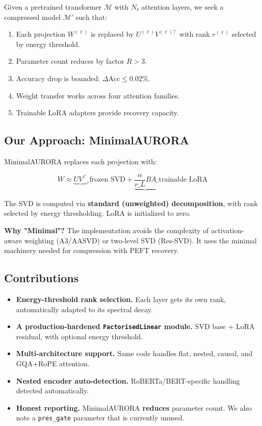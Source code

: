 Given a pretrained transformer $\mathcal{M}$ with $N_\ell$ attention layers, 
we seek a compressed model $\mathcal{M}'$ such that:

\begin{enumerate}
\item Each projection $W^{(\ell)}$ is replaced by $U^{(\ell)} V^{(\ell)\top}$
  with rank $r^{(\ell)}$ selected by energy threshold.
\item Parameter count reduces by factor $R > 3$.
\item Accuracy drop is bounded: $\Delta\text{Acc} \leq 0.02\%$.
\item Weight transfer works across four attention families.
\item Trainable LoRA adapters provide recovery capacity.

\end{enumerate}
\subsection{Our Approach: MinimalAURORA}

MinimalAURORA replaces each projection with:

\[
W \approx \underbrace{U V^\top}\_{\text{frozen SVD}} + \underbrace{\frac{\alpha}{r\_L} B A}\_{\text{trainable LoRA}}
\tag{1.2}
\]

The SVD is computed via \textbf{standard (unweighted) decomposition}, with rank 
selected by energy thresholding. LoRA is initialized to zero.

\textbf{Why "Minimal"?} The implementation avoids the complexity of 
activation-aware weighting (A3/AASVD) or two-level SVD (Res-SVD). It uses 
the minimal machinery needed for compression with PEFT recovery.

\subsection{Contributions}

\begin{itemize}
\item \textbf{Energy-threshold rank selection.} Each layer gets its own rank,
  automatically adapted to its spectral decay.
\item \textbf{A production-hardened \texttt{FactorisedLinear} module.} SVD base + LoRA
  residual, with optional energy threshold.
\item \textbf{Multi-architecture support.} Same code handles flat, nested, causal,
  and GQA+RoPE attention.
\item \textbf{Nested encoder auto-detection.} RoBERTa/BERT-specific handling
  detected automatically.
\item \textbf{Honest reporting.} MinimalAURORA \textbf{reduces} parameter count. We also
  note a \texttt{pres\_gate} parameter that is currently unused.

\end{itemize}
